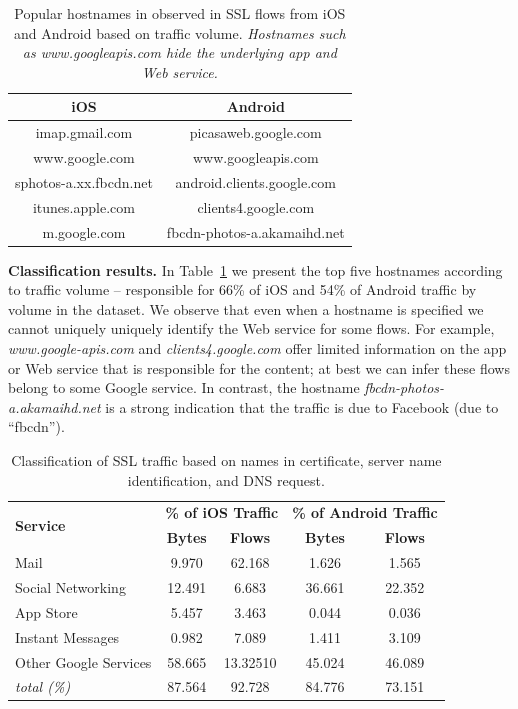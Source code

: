 \begin{table}
\centering
\begin{small}
\begin{tabular}{|c|c|}
\hline
{\bf iOS} & {\bf Android} \tabularnewline
\hline
imap.gmail.com & picasaweb.google.com \tabularnewline
www.google.com & www.googleapis.com \tabularnewline
sphotos-a.xx.fbcdn.net & android.clients.google.com \tabularnewline
itunes.apple.com  & clients4.google.com \tabularnewline
m.google.com & fbcdn-photos-a.akamaihd.net \tabularnewline
\hline
\end{tabular}
\end{small}
\caption{Popular hostnames in observed in SSL flows from iOS and Android based on traffic volume. \emph{Hostnames such as www.googleapis.com hide the underlying app and Web service.}}
\label{tab:sslclassify-popular-host}
\end{table}

\noindent\textbf{Classification results.} In Table~\ref{tab:sslclassify-popular-host} we present the top five hostnames according to traffic volume -- responsible for 66\% of iOS and 54\% of Android traffic by volume in the \mobWild dataset. 
We observe that even when a hostname is specified we cannot uniquely uniquely identify the Web service for some flows.
For example, \emph{www.google-apis.com} and \emph{clients4.google.com} offer limited information on the app or Web service that is responsible for the content; at best we can infer these flows belong to some Google service.
In contrast, the  hostname \emph{fbcdn-photos-a.akamaihd.net} is a strong indication that the traffic is due to Facebook (due to ``fbcdn'').

\begin{table}
\centering
\begin{small}
\begin{tabular}{|p{}|c|c|c|c|}
\hline
\multirow{2}{*}{\bf Service} & \multicolumn{2}{c|}{\bf \% of iOS Traffic} &  \multicolumn{2}{c|}{\bf \% of Android Traffic} \tabularnewline
\cline{2-5}
  & {\bf Bytes}  & {\bf Flows} & {\bf Bytes} & {\bf Flows} \tabularnewline
\hline
Mail                 & 9.970    & 62.168   & 1.626  & 1.565 \tabularnewline
\hline
Social Networking    & 12.491   & 6.683    & 36.661 & 22.352 \tabularnewline
\hline
App Store   & 5.457    & 3.463    & 0.044  & 0.036 \tabularnewline
\hline
Instant Messages     & 0.982    & 7.089    & 1.411  & 3.109 \tabularnewline
\hline
Other Google Services & 58.665   & 13.32510 & 45.024 & 46.089 \tabularnewline
\hline
\emph{total (\%)}         & 87.564   & 92.728   & 84.776 & 73.151 \tabularnewline
\hline
\end{tabular} 
\end{small}
\caption{Classification of \mobWild SSL traffic based on names in certificate, server name identification, and DNS request.}
\label{tab:classify-ssl-traffic}
\end{table}

